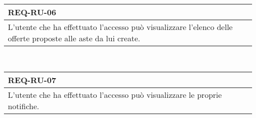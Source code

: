         \begin{tabular}{|p{}|}
            \hline
            \multicolumn{1}{|l|}{\cellcolor{head}\textbf{REQ-RU-06}} \\
            \hline
            L'utente che ha effettuato l'accesso può visualizzare l'elenco delle offerte proposte alle aste da lui create. \\
            \hline
        \end{tabular} \smallskip \\
        \begin{tabular}{|p{}|}
            \hline
            \multicolumn{1}{|l|}{\cellcolor{head}\textbf{REQ-RU-07}} \\
            \hline
            L'utente che ha effettuato l'accesso può visualizzare le proprie notifiche. \\
            \hline
        \end{tabular} \smallskip \\
